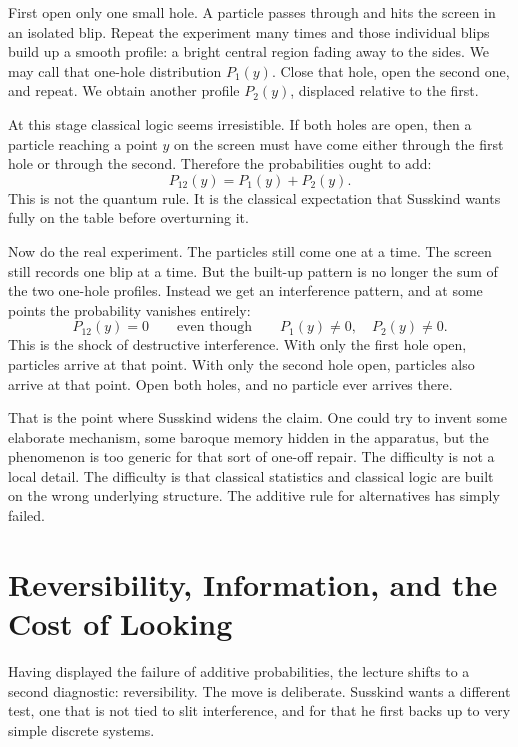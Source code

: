 First open only one small hole. A particle passes through and hits the screen in an isolated blip. Repeat the experiment many times and those individual blips build up a smooth profile: a bright central region fading away to the sides. We may call that one-hole distribution \(P_1(y)\). Close that hole, open the second one, and repeat. We obtain another profile \(P_2(y)\), displaced relative to the first.

At this stage classical logic seems irresistible. If both holes are open, then a particle reaching a point \(y\) on the screen must have come either through the first hole or through the second. Therefore the probabilities ought to add:
\begin{equation}
P_{12}(y)=P_1(y)+P_2(y).
\end{equation}
This is not the quantum rule. It is the classical expectation that Susskind wants fully on the table before overturning it.

Now do the real experiment. The particles still come one at a time. The screen still records one blip at a time. But the built-up pattern is no longer the sum of the two one-hole profiles. Instead we get an interference pattern, and at some points the probability vanishes entirely:
\begin{equation}
P_{12}(y)=0
\qquad \text{even though} \qquad
P_1(y)\neq 0,\quad P_2(y)\neq 0.
\end{equation}
This is the shock of destructive interference. With only the first hole open, particles arrive at that point. With only the second hole open, particles also arrive at that point. Open both holes, and no particle ever arrives there.

That is the point where Susskind widens the claim. One could try to invent some elaborate mechanism, some baroque memory hidden in the apparatus, but the phenomenon is too generic for that sort of one-off repair. The difficulty is not a local detail. The difficulty is that classical statistics and classical logic are built on the wrong underlying structure. The additive rule for alternatives has simply failed.

\section{Reversibility, Information, and the Cost of Looking}

Having displayed the failure of additive probabilities, the lecture shifts to a second diagnostic: reversibility. The move is deliberate. Susskind wants a different test, one that is not tied to slit interference, and for that he first backs up to very simple discrete systems.

